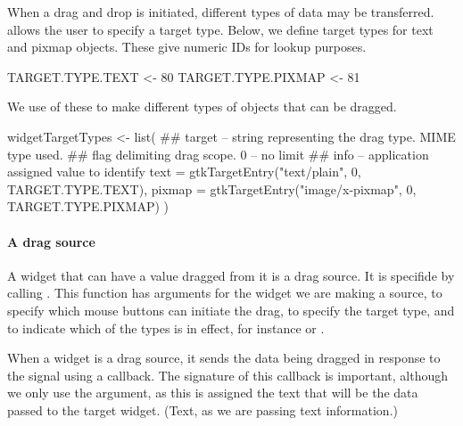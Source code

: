 When a drag and drop is initiated, different types of data may be
transferred. \GTK\/ allows the user to specify a target type. Below,
we define target types for text and pixmap objects. These
give numeric IDs for lookup purposes.
\begin{Schunk}
\begin{Sinput}
 TARGET.TYPE.TEXT   <- 80                 
 TARGET.TYPE.PIXMAP <- 81                  
\end{Sinput}
\end{Schunk}
We use of these to make different types of objects that can be dragged.
\begin{Schunk}
\begin{Sinput}
 widgetTargetTypes <- list(
 ## target -- string representing the drag type. MIME type used.
 ## flag delimiting drag scope. 0 -- no limit
 ## info -- application assigned value to identify
 text = gtkTargetEntry("text/plain", 0, TARGET.TYPE.TEXT),
 pixmap = gtkTargetEntry("image/x-pixmap", 0, TARGET.TYPE.PIXMAP)
 )
\end{Sinput}
\end{Schunk}

\paragraph{A drag source}
A widget that can have a value dragged from it is a drag source. It is
specifide by calling
. This function has arguments
 for the widget we are making a
source,   to specify
which mouse buttons can initiate the drag,
 to specify the target type, and
 to indicate which of the
 types is in effect, for instance  or
. 

When a widget is a drag source, it sends the data being dragged in
response to the  signal using a callback. The
signature of this callback is important, although we only use the
 argument, as this is assigned the text that will be the
data passed to the target widget. (Text, as we are passing text
information.)

\begin{Schunk}
\end{Schunk}

